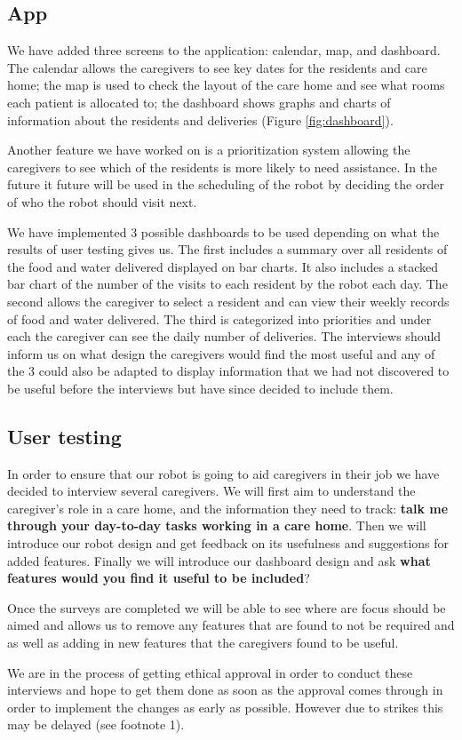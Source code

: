 \documentclass{article}
\begin{document}
\subsection{App}
\par We have added three screens to the application: calendar, map, and dashboard. The calendar allows the caregivers to see key dates for the residents and care home; the map is used to check the layout of the care home and see what rooms each patient is allocated to; the dashboard shows graphs and charts of information about the residents and deliveries (Figure \ref{fig:dashboard}). 
\par Another feature we have worked on is a prioritization system allowing the caregivers to see which of the residents is more likely to need assistance. In the future it future will be used in the scheduling of the robot by deciding the order of who the robot should visit next.
\par We have implemented 3 possible dashboards to be used depending on what the results of user testing gives us. The first includes a summary over all residents of the food and water delivered displayed on bar charts. It also includes a stacked bar chart of the number of the visits to each resident by the robot each day. The second allows the caregiver to select a resident and can view their weekly records of food and water delivered. The third is categorized into priorities and under each the caregiver can see the daily number of deliveries. The interviews should inform us on what design the caregivers would find the most useful and any of the 3 could also be adapted to display information that we had not discovered to be useful before the interviews but have since decided to include them.

\subsection{User testing}
\par In order to ensure that our robot is going to aid caregivers in their job we have decided to interview several caregivers. We will first aim to understand the caregiver's role in a care home, and the information they need to track: {\bf talk me through your day-to-day tasks working in a care home}. Then we will introduce our robot design and get feedback on its usefulness and suggestions for added features. Finally we will introduce our dashboard design and ask {\bf what features would you find it useful to be included}?
\par Once the surveys are completed we will be able to see where are focus should be aimed and allows us to remove any features that are found to not be required and as well as adding in new features that the caregivers found to be useful.
\par We are in the process of getting ethical approval in order to conduct these interviews and hope to get them done as soon as the approval comes through in order to implement the changes as early as possible. However due to strikes this may be delayed (see footnote 1).
\end{document}
